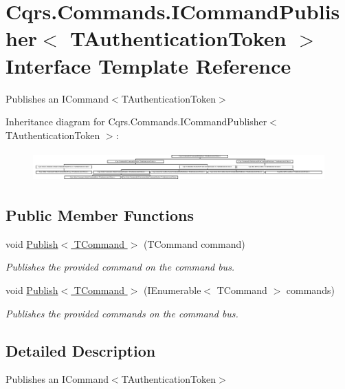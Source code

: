 \hypertarget{interfaceCqrs_1_1Commands_1_1ICommandPublisher}{}\section{Cqrs.\+Commands.\+I\+Command\+Publisher$<$ T\+Authentication\+Token $>$ Interface Template Reference}
\label{interfaceCqrs_1_1Commands_1_1ICommandPublisher}


Publishes an I\+Command$<$\+T\+Authentication\+Token$>$  


Inheritance diagram for Cqrs.\+Commands.\+I\+Command\+Publisher$<$ T\+Authentication\+Token $>$\+:\begin{figure}[H]
\begin{center}
\leavevmode
\includegraphics[height=1.159420cm]{interfaceCqrs_1_1Commands_1_1ICommandPublisher}
\end{center}
\end{figure}
\subsection*{Public Member Functions}
\begin{DoxyCompactItemize}
\item 
void \hyperlink{interfaceCqrs_1_1Commands_1_1ICommandPublisher_aeeb487ad5686d9c44d214b1daaf7833a}{Publish$<$ T\+Command $>$} (T\+Command command)
\begin{DoxyCompactList}\small\item\em Publishes the provided {\itshape command}  on the command bus. \end{DoxyCompactList}\item 
void \hyperlink{interfaceCqrs_1_1Commands_1_1ICommandPublisher_af0f033c0b949e5650032e4f00b11b595}{Publish$<$ T\+Command $>$} (I\+Enumerable$<$ T\+Command $>$ commands)
\begin{DoxyCompactList}\small\item\em Publishes the provided {\itshape commands}  on the command bus. \end{DoxyCompactList}\end{DoxyCompactItemize}


\subsection{Detailed Description}
Publishes an I\+Command$<$\+T\+Authentication\+Token$>$ 



